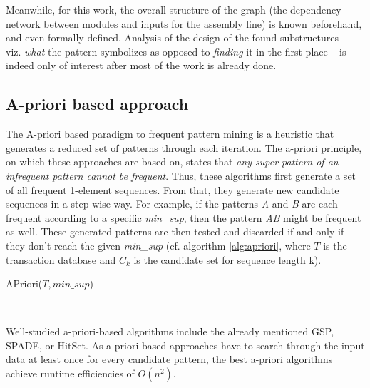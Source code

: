 \documentclass[pdftex,12pt,a4paper]{report}
\begin{document}
Meanwhile, for this work, the overall structure of the graph (the dependency network between modules and inputs for the assembly line) is known beforehand, and even formally defined. Analysis of the design of the found substructures -- viz. \textit{what} the pattern symbolizes as opposed to \textit{finding} it in the first place -- is indeed only of interest after most of the work is already done.

\subsection{A-priori based approach}
\label{subsection:apriori}
The A-priori based paradigm to frequent pattern mining is a heuristic that generates a reduced set of patterns through each iteration.\cite{Pei2000-rz} The a-priori principle, on which these approaches are based on, states that \textit{any super-pattern of an infrequent pattern cannot be frequent}.\cite{Han2004-qs} Thus, these algorithms first generate a set of all frequent 1-element sequences. From that, they generate new candidate sequences in a step-wise way. For example, if the patterns \textit{A} and \textit{B} are each frequent according to a specific \textit{min\_sup}, then the pattern \textit{AB} might be frequent as well. These generated patterns are then tested and discarded if and only if they don't reach the given \textit{min\_sup} (cf. algorithm \ref{alg:apriori}, where $T$ is the transaction database and $C_k$ is the candidate set for sequence length k).

\begin{algorithm}
	\caption[APriori($T,min\_sup$)]{APriori($T,min\_sup$)\cite{Agrawal1994-ca}}\label{alg:apriori}
	\begin{algorithmic}[1]
		\EndFor
		\EndFor
		\EndWhile \\
	\end{algorithmic}
\end{algorithm}

Well-studied a-priori-based algorithms include the already mentioned GSP\cite{Srikant1996-dy}, SPADE\cite{Zaki2001-jy}, or HitSet\cite{Han1999-bj}. As a-priori-based approaches have to search through the input data at least once for every candidate pattern, the best a-priori algorithms achieve runtime efficiencies of $O(n^2)$.
\end{document}

